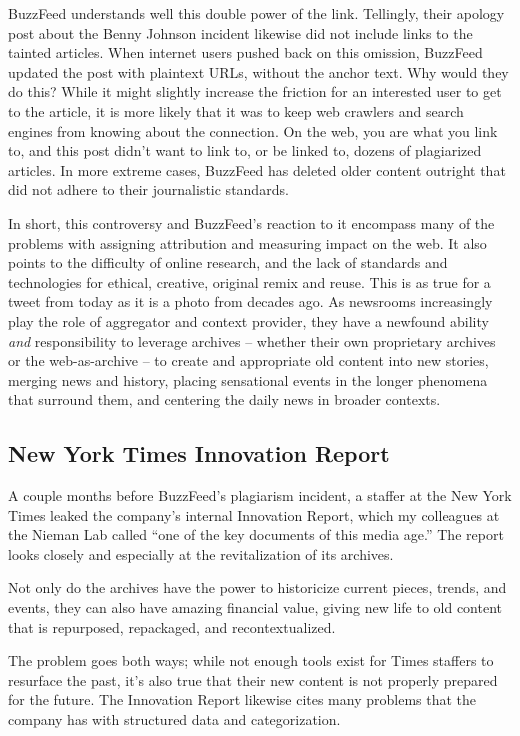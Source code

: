 BuzzFeed understands well this double power of the link. Tellingly, their apology post about the Benny Johnson incident likewise did not include links to the tainted articles. When internet users pushed back on this omission, BuzzFeed updated the post with plaintext URLs, without the anchor text. Why would they do this? While it might slightly increase the friction for an interested user to get to the article, it is more likely that it was to keep web crawlers and search engines from knowing about the connection. On the web, you are what you link to, and this post didn't want to link to, or be linked to, dozens of plagiarized articles. In more extreme cases, BuzzFeed has deleted older content outright that did not adhere to their journalistic standards.

In short, this controversy and BuzzFeed's reaction to it encompass many of the problems with assigning attribution and measuring impact on the web. It also points to the difficulty of online research, and the lack of standards and technologies for ethical, creative, original remix and reuse. This is as true for a tweet from today as it is a photo from decades ago. As newsrooms increasingly play the role of aggregator and context provider, they have a newfound ability \emph{and} responsibility to leverage archives -- whether their own proprietary archives or the web-as-archive -- to create and appropriate old content into new stories, merging news and history, placing sensational events in the longer phenomena that surround them, and centering the daily news in broader contexts.

\subsection{New York Times Innovation Report}

A couple months before BuzzFeed's plagiarism incident, a staffer at the New York Times leaked the company's internal Innovation Report, which my colleagues at the Nieman Lab called ``one of the key documents of this media age.'' The report looks closely and especially at the revitalization of its archives.

Not only do the archives have the power to historicize current pieces, trends, and events, they can also have amazing financial value, giving new life to old content that is repurposed, repackaged, and recontextualized.

The problem goes both ways; while not enough tools exist for Times staffers to resurface the past, it's also true that their new content is not properly prepared for the future. The Innovation Report likewise cites many problems that the company has with structured data and categorization.

